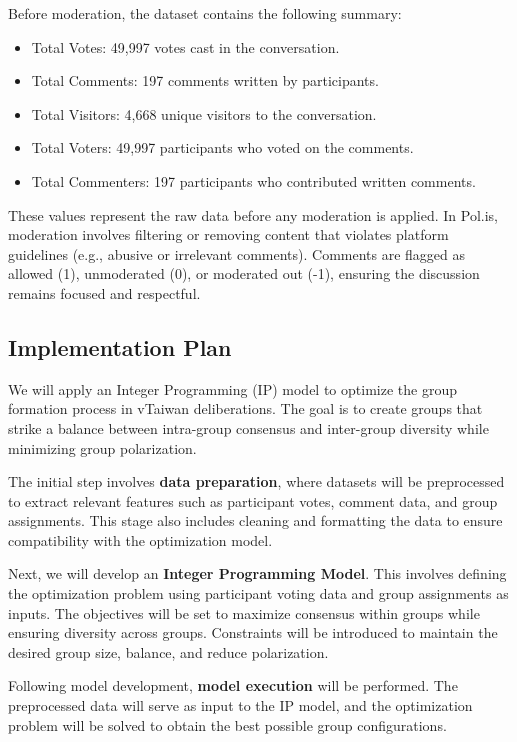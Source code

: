 \documentclass[11pt,a4paper]{article}
\begin{document}
Before moderation, the dataset contains the following summary:
\begin{itemize}
    \item Total Votes: 49,997 votes cast in the conversation.
    \item Total Comments: 197 comments written by participants.
    \item Total Visitors: 4,668 unique visitors to the conversation.
    \item Total Voters: 49,997 participants who voted on the comments.
    \item Total Commenters: 197 participants who contributed written comments.
\end{itemize}

These values represent the raw data before any moderation is applied. In Pol.is, moderation involves filtering or removing content that violates platform guidelines (e.g., abusive or irrelevant comments). Comments are flagged as allowed (1), unmoderated (0), or moderated out (-1), ensuring the discussion remains focused and respectful.

\subsection{Implementation Plan}

We will apply an Integer Programming (IP) model to optimize the group formation process in vTaiwan deliberations. The goal is to create groups that strike a balance between intra-group consensus and inter-group diversity while minimizing group polarization.

The initial step involves \textbf{data preparation}, where datasets will be preprocessed to extract relevant features such as participant votes, comment data, and group assignments. This stage also includes cleaning and formatting the data to ensure compatibility with the optimization model.

Next, we will develop an \textbf{Integer Programming Model}. This involves defining the optimization problem using participant voting data and group assignments as inputs. The objectives will be set to maximize consensus within groups while ensuring diversity across groups. Constraints will be introduced to maintain the desired group size, balance, and reduce polarization.

Following model development, \textbf{model execution} will be performed. The preprocessed data will serve as input to the IP model, and the optimization problem will be solved to obtain the best possible group configurations.
\end{document}
